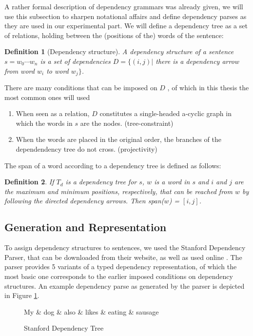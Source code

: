 \documentclass{report}
\theoremstyle{definition}
\theoremstyle{plain}
\newtheorem{definition}{Definition}
\begin{document}
A rather formal description of dependency grammars was already given, we will use this subsection to sharpen notational affairs and define dependency parses as they are used in our experimental part. We will define a dependency tree as a set of relations, holding between the (positions of the) words of the sentence:

\begin{definition}[Dependency structure]
A dependency structure of a sentence $s = w_0\cdots w_n$ is a set of dependencies $D = \{ (i,j) |$ there is a dependency arrow from word $w_i$ to word $w_j \}$. 
\end{definition}

There are many conditions that can be imposed on $D$ \citep{de2006generating}, of which in this thesis the most common ones will used\begin{enumerate}
\item When seen as a relation, $D$ constitutes a single-headed a-cyclic graph in which the words in $s$ are the nodes. (tree-constraint)
\item When the words are placed in the original order, the branches of the dependendency tree do not cross. (projectivity)
\end{enumerate}

The span of a word according to a dependency tree is defined as follows:

\begin{definition}
If $T_d$ is a dependency tree for $s$, $w$ is a word in $s$ and $i$ and $j$ are the maximum and minimum positions, respectively, that can be reached from $w$ by following the directed dependency arrows. Then span($w$) = $[i,j]$. 
\end{definition}

\subsection{Generation and Representation}

To assign dependency structures to sentences, we used the Stanford Dependency Parser, that can be downloaded from their website, as well as used online  \citep{de2006generating}. The parser provides 5 variants of a typed dependency representation, of which the most basic one corresponds to the earlier imposed conditions on dependency structures. An example dependency parse as generated by the parser is depicted in Figure \ref{fig:deptree1}.

\begin{figure}[!h]\label{fig:deptree1}
\centering
\begin{dependency}[theme=simple]%
\begin{deptext}[column sep=.5cm, row sep=.1ex]
My \& dog \& also \& likes \& eating \& sausage \\
\end{deptext}
\end{dependency}
\caption{Stanford Dependency Tree}
\end{figure}
\end{document}
